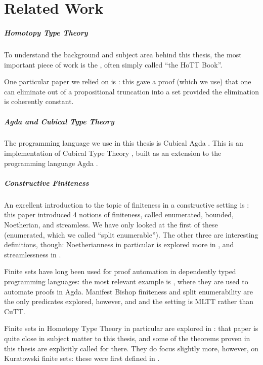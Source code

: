 \chapter{Related Work}
\paragraph{Homotopy Type Theory}
To understand the background and subject area behind this thesis, the most
important piece of work is the \citet{hottbook}, often simply called ``the HoTT
Book''.

One particular paper we relied on is \citet{krausGeneralUniversalProperty2015}:
this gave a proof (which we use) that one can eliminate out of a propositional
truncation into a set provided the elimination is coherently constant.
\paragraph{Agda and Cubical Type Theory}
The programming language we use in this thesis is Cubical Agda
\citep{vezzosiCubicalAgdaDependently2019}.
This is an implementation of Cubical Type Theory
\citep{cohenCubicalTypeTheory2016}, built as an extension to the programming
language Agda \citep{norellDependentlyTypedProgramming2008}.
\paragraph{Constructive Finiteness}
An excellent introduction to the topic of finiteness in a constructive setting
is \citet{coquandConstructivelyFinite2010}: this paper introduced 4 notions of
finiteness, called enumerated, bounded, Noetherian, and streamless.
We have only looked at the first of these (enumerated, which we called ``split
enumerable'').
The other three are interesting definitions, though: Noetherianness in
particular is explored more in \citet{firsovVariationsNoetherianness2016}, and
streamlessness in \citet{parmannInvestigatingStreamlessSets2015}.

Finite sets have long been used for proof automation in dependently typed
programming languages: the most relevant example is
\citet{firsovDependentlyTypedProgramming2015}, where they are used to automate
proofs in Agda.
Manifest Bishop finiteness and split enumerability are the only predicates
explored, however, and and the setting is MLTT rather than CuTT.

Finite sets in Homotopy Type Theory in particular are explored in
\citet{fruminFiniteSetsHomotopy2018}: that paper is quite close in subject
matter to this thesis, and some of the theorems proven in this thesis are
explicitly called for there.
They do focus slightly more, however, on Kuratowski finite sets: these were
first defined in \citet{kuratowskiNotionEnsembleFini1920}.
